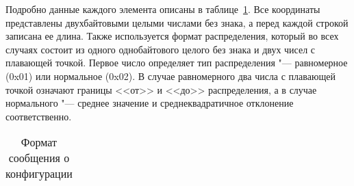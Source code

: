 Подробно данные каждого элемента описаны в таблице~\ref{sec:development:preprocessor:format_table}.
Все координаты представлены двухбайтовыми целыми числами без знака, а перед каждой строкой записана ее длина.
Также используется формат распределения, который во всех случаях состоит из одного однобайтового целого без знака и двух чисел с плавающей точкой.
Первое число определяет тип распределения "--- равномерное (0x01) или нормальное (0x02).
В случае равномерного два числа с плавающей точкой означают границы <<от>> и <<до>> распределения,
а в случае нормального "--- среднее значение и среднеквадратичное отклонение соответственно.

\newpage
\begin{longtable}[ht]{| >{\centering}m{}
                      | >{\centering}m{}
                      | >{\centering\arraybackslash}m{}|}
\caption{Формат сообщения о конфигурации} \label{sec:development:preprocessor:format_table}\tabularnewline


\end{longtable}
